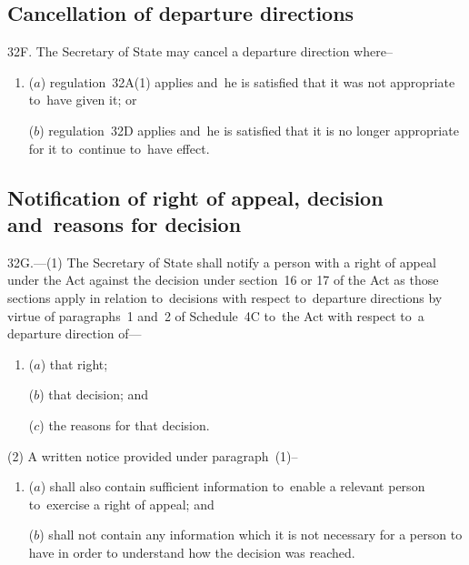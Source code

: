 \documentclass[12pt,a4paper]{article}
\begin{document}
\subsection[32F. Cancellation of departure directions]{Cancellation of departure directions}

32F.  The Secretary of State may cancel a departure direction where–
\begin{enumerate}\item[]
($a$) regulation~32A(1) applies and~he is satisfied that it was not appropriate to~have given it; or

($b$) regulation~32D applies and~he is satisfied that it is no longer appropriate for it to~continue to~have effect.
\end{enumerate}


\subsection[32G. Notification of right of appeal, decision and~reasons for decision]{Notification of right of appeal, decision and~reasons for decision}

32G.—(1) The Secretary of State shall notify a person with a right of appeal under the Act against the decision under section~16 or 17 of the Act as those sections apply in relation to~decisions with respect to~departure directions by virtue of paragraphs~1 and~2 of Schedule~4C to~the Act with respect to~a departure direction of---
\begin{enumerate}\item[]
($a$) that right;

($b$) that decision; and

($c$) the reasons for that decision.
\end{enumerate}

(2) A written notice provided under paragraph~(1)–
\begin{enumerate}\item[]
($a$) shall also contain sufficient information to~enable a relevant person to~exercise a right of appeal; and

($b$) shall not contain any information which it is not necessary for a person to have in order to understand how the decision was reached.
\end{enumerate}

\end{document}
